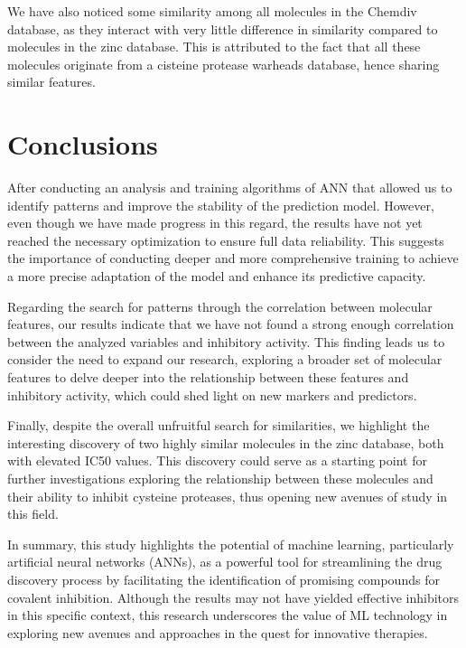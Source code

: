 \documentclass[final,times,twocolumn,article]{elsarticle}
\begin{document}
We have also noticed some similarity among all molecules in the Chemdiv database, as they interact with very little difference in similarity compared to molecules in the zinc database. This is attributed to the fact that all these molecules originate from a cisteine protease warheads database, hence sharing similar features.

\FloatBarrier
\section{Conclusions}

After conducting an analysis and training algorithms of ANN that allowed us to identify patterns and improve the stability of the prediction model. However, even though we have made progress in this regard, the results have not yet reached the necessary optimization to ensure full data reliability. This suggests the importance of conducting deeper and more comprehensive training to achieve a more precise adaptation of the model and enhance its predictive capacity.

Regarding the search for patterns through the correlation between molecular features, our results indicate that we have not found a strong enough correlation between the analyzed variables and inhibitory activity. This finding leads us to consider the need to expand our research, exploring a broader set of molecular features to delve deeper into the relationship between these features and inhibitory activity, which could shed light on new markers and predictors.

Finally, despite the overall unfruitful search for similarities, we highlight the interesting discovery of two highly similar molecules in the zinc database, both with elevated IC50 values. This discovery could serve as a starting point for further investigations exploring the relationship between these molecules and their ability to inhibit cysteine proteases, thus opening new avenues of study in this field.

In summary, this study highlights the potential of machine learning, particularly artificial neural networks (ANNs), as a powerful tool for streamlining the drug discovery process by facilitating the identification of promising compounds for covalent inhibition. Although the results may not have yielded effective inhibitors in this specific context, this research underscores the value of ML technology in exploring new avenues and approaches in the quest for innovative therapies.
\end{document}

